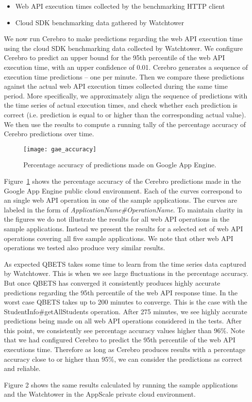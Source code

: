 \begin{itemize}
\item Web API execution times collected by the benchmarking HTTP client
\item Cloud SDK benchmarking data gathered by Watchtower
\end{itemize}

We now run Cerebro to make predictions regarding the web API execution time using the cloud SDK benchmarking data
collected by Watchtower. We configure Cerebro to predict an upper bound for the 95th percentile of the web API
execution time, with an upper confidence of 0.01. Cerebro generates a sequence of execution time predictions -- one 
per minute. Then we compare these predictions against the actual web API execution times collected during the same
time period. More specifically, we approximately align the sequence of predictions with the time series of actual execution
times, and check whether each prediction is correct (i.e. prediction is equal to or higher than the
corresponding actual value). We then use the results to compute a running tally of the percentage accuracy of Cerebro
predictions over time.

\begin{figure}
\centering
\texttt{[image: gae\_accuracy]}
\caption{Percentage accuracy of predictions made on Google App Engine.}
\label{fig:gae_accuracy}
\end{figure}

Figure~\ref{fig:gae_accuracy} shows the percentage accuracy of the Cerebro predictions made in the Google App Engine 
public cloud environment. Each of the curves correspond to an single web API operation in one of the sample applications. 
The curves are labeled in the form of \textit{ApplicationName\#OperationName}. To maintain clarity in the figures we do not 
illustrate the results for all web API operations in the sample applications. Instead we present the results for a selected set of 
web API operations covering all five sample applications. We note that other web API operations we tested also produce
very similar results.

As expected QBETS takes some time to learn
from the time series data captured by Watchtower. This is when we see large fluctuations in the percentage accuracy. But
once QBETS has converged it consistently produces highly accurate predictions regarding the 95th percentile of the web API
response time. In the worst case QBETS takes up to 200 minutes to converge. This is the case with the
StudentInfo\#getAllStudents operation. After 275 minutes, we see highly accurate predictions being made on all web API
operations considered in the tests. After this point, we consistently see percentage accuracy values higher than 96\%. Note that
we had configured Cerebro to predict the 95th percentile of the web API executions time. Therefore as long as Cerebro produces
results with a percentage accuracy close to or higher than 95\%, we can consider the predictions as correct and reliable.

Figure 2 shows the same results calculated by running the sample applications and the Watchtower in the AppScale private cloud
environment.